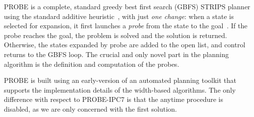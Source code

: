 PROBE is a complete, standard greedy best first search (GBFS) STRIPS
planner using the standard {additive heuristic}~\cite{bonet:aij-hsp},
with just \emph{one change}: when a state is selected for expansion,
it first launches a \emph{probe} from the state to the goal~\cite{nir:icaps11}. If the
probe reaches the goal, the problem is solved and the solution is
returned. Otherwise, the states expanded by probe are added to the
open list, and control returns to the GBFS loop. The crucial
  and only novel part in the planning algorithm is the definition and
  computation of the probes.

PROBE is built using an early-version of an automated planning toolkit
that supports the implementation details of the width-based
algorithms. The only difference with respect to PROBE-IPC7 is that the
anytime procedure is disabled, as we are only concerned with the first
solution.
